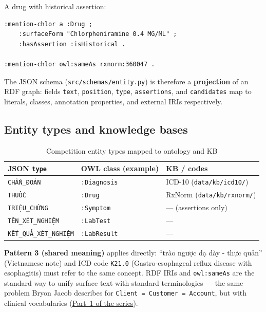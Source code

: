 A drug with historical assertion:

\begin{verbatim}
:mention-chlor a :Drug ;
    :surfaceForm "Chlorpheniramine 0.4 MG/ML" ;
    :hasAssertion :isHistorical .

:mention-chlor owl:sameAs rxnorm:360047 .
\end{verbatim}

The JSON schema (\texttt{src/schemas/entity.py}) is therefore a \textbf{projection}
of an RDF graph: fields \texttt{text}, \texttt{position}, \texttt{type},
\texttt{assertions}, and \texttt{candidates} map to literals, classes, annotation
properties, and external IRIs respectively.

\subsection{Entity types and knowledge bases}

\begin{table}[htbp]
  \centering
  \small
  \caption{Competition entity types mapped to ontology and KB}
  \label{tab:entity-kb}
  \renewcommand{\arraystretch}{1.15}
  \begin{tabularx}{\textwidth}{@{}l l l@{}}
    \toprule
    \textbf{JSON \texttt{type}} & \textbf{OWL class (example)} & \textbf{KB / codes} \\
    \midrule
    \texttt{CHẨN\_ĐOÁN} & \texttt{:Diagnosis} & ICD-10 (\texttt{data/kb/icd10/}) \\
    \texttt{THUỐC} & \texttt{:Drug} & RxNorm (\texttt{data/kb/rxnorm/}) \\
    \texttt{TRIỆU\_CHỨNG} & \texttt{:Symptom} & --- (assertions only) \\
    \texttt{TÊN\_XÉT\_NGHIỆM} & \texttt{:LabTest} & --- \\
    \texttt{KẾT\_QUẢ\_XÉT\_NGHIỆM} & \texttt{:LabResult} & --- \\
    \bottomrule
  \end{tabularx}
\end{table}

\textbf{Pattern 3 (shared meaning)} applies directly: ``trào ngược dạ dày - thực
quản'' (Vietnamese note) and ICD code \texttt{K21.0} (Gastro-esophageal reflux
disease with esophagitis) must refer to the same concept. RDF IRIs and
\texttt{owl:sameAs} are the standard way to unify surface text with standard
terminologies --- the same problem Bryon Jacob describes for \texttt{Client =
Customer = Account}, but with clinical vocabularies
(\href{https://bryon.io/why-rdf-is-the-natural-knowledge-layer-for-ai-systems-a5fd0b43d4c5}{Part~1 of the series}).

